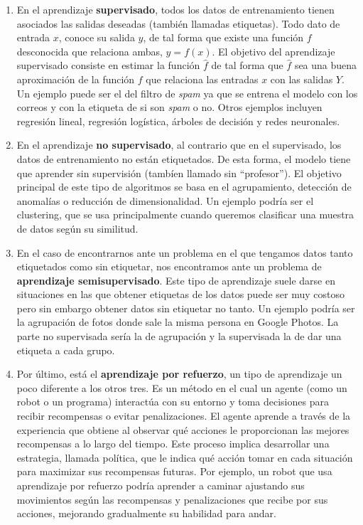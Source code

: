 \begin{enumerate}
	\item En el aprendizaje \textbf{supervisado}, todos los datos de entrenamiento tienen asociados las salidas deseadas (también llamadas etiquetas). Todo dato de entrada \( x \), conoce su salida \( y \), de tal forma que existe una función $f$ desconocida que relaciona ambas, $y=f(x)$. El objetivo del aprendizaje supervisado consiste en estimar la función $\hat{f}$ de tal forma que $\hat{f}$ sea una buena aproximación de la función $f$ que relaciona las entradas $x$ con las salidas $Y$. Un ejemplo puede ser el del filtro de \textit{spam} ya que se entrena el modelo con los correos y con la etiqueta de si son \textit{spam} o no. Otros ejemplos incluyen regresión lineal, regresión logística, árboles de decisión y redes neuronales.

	\item En el aprendizaje \textbf{no supervisado}, al contrario que en el supervisado, los datos de entrenamiento no están etiquetados. De esta forma, el modelo tiene que aprender sin supervisión (tambíen llamado sin ``profesor''). El objetivo principal de este tipo de algoritmos se basa en el agrupamiento, detección de anomalías o reducción de dimensionalidad. Un ejemplo podría ser el clustering, que se usa principalmente cuando queremos clasificar una muestra de datos según su similitud.

	\item En el caso de encontrarnos ante un problema en el que tengamos datos tanto etiquetados como sin etiquetar, nos encontramos ante un problema de \textbf{aprendizaje semisupervisado}. Este tipo de aprendizaje suele darse en situaciones en las que obtener etiquetas de los datos puede ser muy costoso pero sin embargo obtener datos sin etiquetar no tanto. Un ejemplo podría ser la agrupación de fotos donde sale la misma persona en Google Photos. La parte no supervisada sería la de agrupación y la supervisada la de dar una etiqueta a cada grupo.

	\item Por último, está el \textbf{aprendizaje por refuerzo}, un tipo de aprendizaje un poco diferente a los otros tres. Es un método en el cual un agente (como un robot o un programa) interactúa con su entorno y toma decisiones para recibir recompensas o evitar penalizaciones. El agente aprende a través de la experiencia que obtiene al observar qué acciones le proporcionan las mejores recompensas a lo largo del tiempo. Este proceso implica desarrollar una estrategia, llamada política, que le indica qué acción tomar en cada situación para maximizar sus recompensas futuras. Por ejemplo, un robot que usa aprendizaje por refuerzo podría aprender a caminar ajustando sus movimientos según las recompensas y penalizaciones que recibe por sus acciones, mejorando gradualmente su habilidad para andar.
\end{enumerate}


